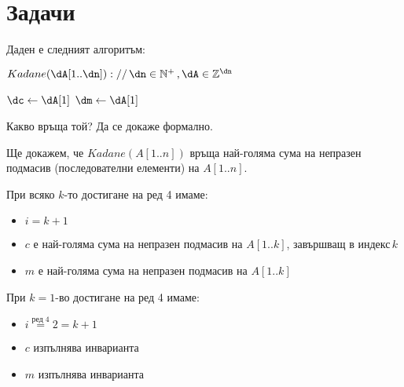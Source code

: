 \newpage

\section{Задачи}

\begin{problem}
	Даден е следният алгоритъм:
	\begin{pseudocode}
		
		$Kadane(\dA[1..\dn])://\,\dn\in\mathbb{N}^+\,,\dA\in\mathbb{Z}^{\dn}$
		\Mybegin
		{
			$\dc\leftarrow\dA[1]$\;
			$\dm\leftarrow\dA[1]$\;
			
			{
				\If{$\dA[\di]+\dc>\dA[i]$}{$\dc\leftarrow\dc+\dA[\di]$\;}
				\Else{$\dc\leftarrow\dA[\di]$\;}
				
				\If{$\dc>\dm$}{$\dm\leftarrow\dc$\;}
			}
			
			\KwRet{$\dm$\;}
		}
	\end{pseudocode}
	Какво връща той? Да се докаже формално.
\end{problem}

\begin{solution}
	Ще докажем, че $Kadane(A[1..n])$ връща най-голяма сума на непразен подмасив (последователни елементи) на $A[1..n]$.
\end{solution}

\begin{boxinvariant*}{}{}
	При всяко $k$-то достигане на ред 4 имаме:
	\begin{itemize}
		\item $i=k+1$
		\item $c$ е най-голяма сума на непразен подмасив на $A[1..k]$, завършващ в индекс$\,k$
		\item $m$ е най-голяма сума на непразен подмасив на $A[1..k]$
	\end{itemize}
\end{boxinvariant*}

\begin{base}
	При $k=1$-во достигане на ред 4 имаме:
	\begin{itemize}
		\item $i\overset{\text{ред 4}}=2=k+1$
		\item $c$ изпълнява инварианта
		\item $m$ изпълнява инварианта
	\end{itemize}
\end{base}

